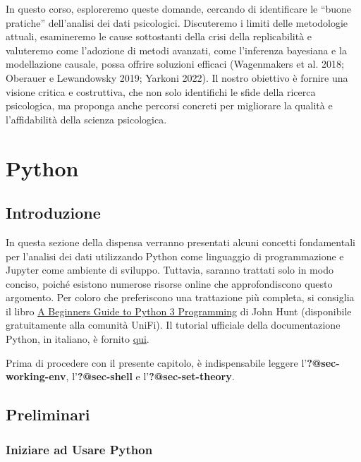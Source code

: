 \documentclass[
  letterpaper,
  krantz2]{{[}./krantz{]}}
\begin{document}
In questo corso, esploreremo queste domande, cercando di identificare le
``buone pratiche'' dell'analisi dei dati psicologici. Discuteremo i
limiti delle metodologie attuali, esamineremo le cause sottostanti della
crisi della replicabilità e valuteremo come l'adozione di metodi
avanzati, come l'inferenza bayesiana e la modellazione causale, possa
offrire soluzioni efficaci (Wagenmakers et al. 2018; Oberauer e
Lewandowsky 2019; Yarkoni 2022). Il nostro obiettivo è fornire una
visione critica e costruttiva, che non solo identifichi le sfide della
ricerca psicologica, ma proponga anche percorsi concreti per migliorare
la qualità e l'affidabilità della scienza psicologica.

\part{Python}

\chapter*{Introduzione}\label{introduzione}


In questa sezione della dispensa verranno presentati alcuni concetti
fondamentali per l'analisi dei dati utilizzando Python come linguaggio
di programmazione e Jupyter come ambiente di sviluppo. Tuttavia, saranno
trattati solo in modo conciso, poiché esistono numerose risorse online
che approfondiscono questo argomento. Per coloro che preferiscono una
trattazione più completa, si consiglia il libro
\href{https://link.springer.com/book/10.1007/978-3-031-35122-8}{A
Beginners Guide to Python 3 Programming} di John Hunt (disponibile
gratuitamente alla comunità UniFi). Il tutorial ufficiale della
documentazione Python, in italiano, è fornito
\href{https://pytutorial-it.readthedocs.io/it/python3.11/index.html}{qui}.

Prima di procedere con il presente capitolo, è indispensabile leggere
l'\textbf{?@sec-working-env}, l'\textbf{?@sec-shell} e
l'\textbf{?@sec-set-theory}.

\chapter{Preliminari}\label{sec-preliminari}

\section{Iniziare ad Usare Python}\label{iniziare-ad-usare-python}
\end{document}
